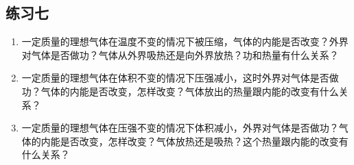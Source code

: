 \subsection*{练习七}
\begin{enumerate}
	\item 一定质量的理想气体在温度不变的情况下被压缩，气体的内能是否改变？外界对气体是否做功？气体从外界吸热还是向外界放热？功和热量有什么关系？
\item 一定质量的理想气体在体积不变的情况下压强减小，这时外界对气体是否做功？气体的内能是否改变，怎样改变？气体放出的热量跟内能的改变有什么关系？
\item 一定质量的理想气体在压强不变的情况下体积减小，外界对气体是否做功？气体的内能是否改变，怎样改变？气体放热还是吸热？这个热量跟内能的改变有什么关系？
\end{enumerate}

